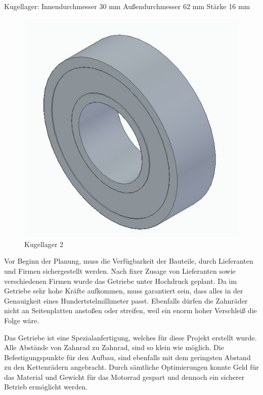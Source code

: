  
Kugellager: Innendurchmesser 30 mm Außendurchmesser 62 mm Stärke 16 mm
\begin{figure} [H]
	\begin{center}
		\includegraphics[scale=0.3]{figures/mechanik/6206-2RS1-SKF_kl.jpg}
			\caption{Kugellager 2}
			\label{fig:Kugellager 2}
	\end{center}
\end{figure}

Vor Beginn der Planung, muss die Verfügbarkeit der Bauteile, durch Lieferanten und Firmen sichergestellt werden. Nach fixer Zusage von Lieferanten sowie verschiedenen Firmen wurde das Getriebe unter Hochdruck geplant. Da im Getriebe sehr hohe Kräfte aufkommen, muss garantiert sein, dass alles in der Genauigkeit eines Hundertstelmillimeter passt. Ebenfalls dürfen die Zahnräder nicht an Seitenplatten anstoßen oder streifen, weil ein enorm hoher Verschleiß die Folge wäre. 

Das Getriebe ist eine Spezialanfertigung, welches für diese Projekt erstellt wurde. Alle Abstände von Zahnrad zu Zahnrad, sind so klein wie möglich. Die Befestigungspunkte für den Aufbau, sind ebenfalls mit dem geringsten Abstand zu den Kettenrädern angebracht. Durch sämtliche Optimierungen konnte Geld für das Material und Gewicht für das Motorrad gespart und dennoch ein sicherer Betrieb ermöglicht werden.

